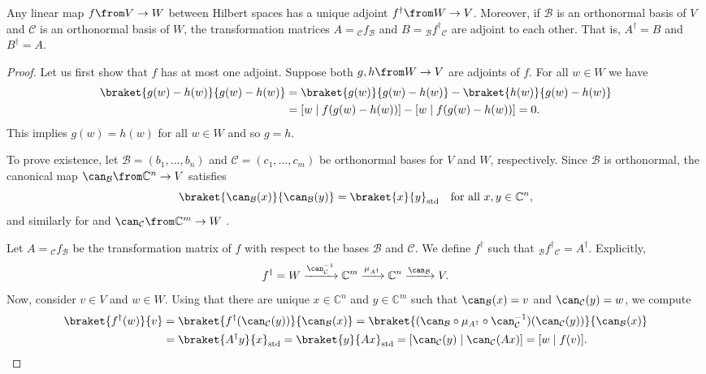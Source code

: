 \documentclass[a4paper,oneside, 12pt]{amsart}
\begin{document}
\begin{proposition}\label{prop:adjoint-morph-is-adjoint-matrix}
  Any linear map \(f \from V \to W\) between Hilbert spaces has a unique adjoint \(f^{\dagger} \from W \to V\).
  Moreover, if \(\mathcal{B}\) is an orthonormal basis of \(V\) and \(\mathcal{C}\) is an orthonormal basis of \(W\), the transformation matrices \(A = {_{\mathcal{C}}f_{\mathcal{B}}}\) and \(B = {_{\mathcal{B}}{f^{\dagger}}{}_{\mathcal{C}}}\) are adjoint to each other.
  That is, \(A^{\dagger} = B\) and \(B^{\dagger} =A\).
\end{proposition}
\begin{proof}
  Let us first show that \(f\) has at most one adjoint.
  Suppose both \(g,h \from W\to V\) are adjoints of \(f\).
  For all \(w\in W\) we have
  \begin{align*}
    \braket{g(w)- h(w)}{g(w) - h(w)}
    & = \braket{g(w)}{g(w) - h(w)} - \braket{h(w)}{g(w) - h(w)}\\
    & = [w\mid f(g(w) - h(w))] - [w \mid f(g(w) - h(w))]
      = 0.
  \end{align*}
  This implies  \(g(w) = h(w)\) for all \(w\in W\) and so \(g = h\).

  To prove existence, let \( \mathcal{B} = (b_1, \dots, b_n) \) and \( \mathcal{C} = (c_1, \dots, c_m) \) be orthonormal bases for \( V \) and \( W \), respectively.
  Since \( \mathcal{B}\) is orthonormal, the canonical map \( \can_{\mathcal{B}} \from \mathbb{C}^n \to V \) satisfies
  \begin{equation*}
    \braket{\can_{\mathcal{B}}(x)}{\can_{\mathcal{B}}(y)} = \braket{x}{y}_{\mathrm{std}} \quad \text{for all } x, y \in \mathbb{C}^n,
  \end{equation*}
  and similarly for  and \( \can_{\mathcal{C}} \from \mathbb{C}^m \to W \) .

  Let \(A= {}_{\mathcal{C}}f_{\mathcal{B}}\) be the transformation matrix of \(f\) with respect to the bases \(\mathcal{B}\) and \(\mathcal{C}\).
  We define \(f^{\dagger}\) such that \(_{\mathcal{B}}f^{\dagger}{}_{\mathcal{C}} = A^{\dagger}\).
  Explicitly,
  \begin{equation*}
    f^{\dagger }= W \xrightarrow{\can_{\mathcal{C}}^{-1}} \mathbb{C}^{m}\xrightarrow{\mu_{A^{\dagger}}} \mathbb{C}^{n}\xrightarrow{\can_{\mathcal{B}}} V.
  \end{equation*}
  Now, consider \(v \in V\) and \(w\in W\).
  Using that there are unique \(x \in \mathbb{C}^{n}\) and \(y \in \mathbb{C}^{m}\) such that
  \(\can_{\mathcal{B}}(x) = v\) and \(\can_{\mathcal{C}}(y) = w\), we compute
  \begin{align*}
    \braket{f^{\dagger}(w)}{v}
    & = \braket{f^{\dagger} (\can_{\mathcal{C}}(y))}{\can_{\mathcal{B}}(x)}
      = \braket{(\can_{\mathcal{B}} \circ \mu_{A^{\dagger}} \circ \can_{\mathcal{C}}^{-1}) (\can _{\mathcal{C}} (y))}{\can_{\mathcal{B}}(x)} \\
    & = \braket{A^{\dagger}y}{x}_{\mathrm{std}}
      = \braket{y}{Ax}_{\mathrm{std}}
      = [\can_{\mathcal{C}}(y) \mid \can_{\mathcal{C}}(Ax)] = [w\mid f(v)]. \qedhere
  \end{align*}
\end{proof}
\end{document}
